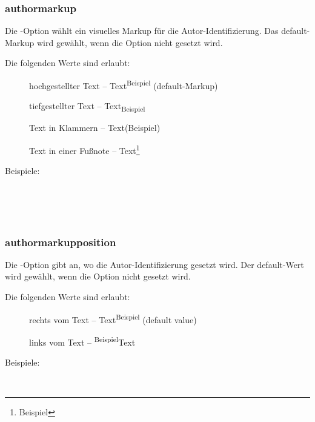 \subsubsection{authormarkup}

Die -Option wählt ein visuelles Markup für die Autor-Identifizierung.
Das default-Markup wird gewählt, wenn die Option nicht gesetzt wird.

Die folgenden Werte sind erlaubt:
\begin{description}
	\item [] hochgestellter Text -- Text\textsuperscript{Beispiel} (default-Markup)
	\item [] tiefgestellter Text -- Text\textsubscript{Beispiel}
	\item [] Text in Klammern -- Text(Beispiel)
	\item [] Text in einer Fußnote -- Text\footnote{Beispiel}
\end{description}

Beispiele:

\\
\\
\\

\subsubsection{authormarkupposition}

Die -Option gibt an, wo die Autor-Identifizierung gesetzt wird.
Der default-Wert wird gewählt, wenn die Option nicht gesetzt wird.

Die folgenden Werte sind erlaubt:
\begin{description}
	\item [] rechts vom Text -- Text\textsuperscript{Beispiel} (default value)
	\item [] links vom Text -- \textsuperscript{Beispiel}Text
\end{description}

Beispiele:

\\

